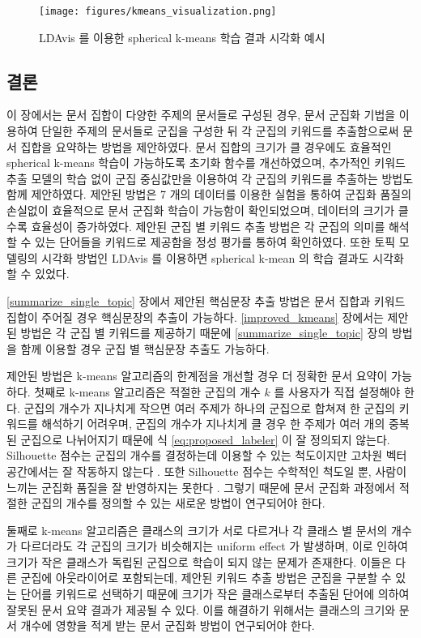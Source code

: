 \documentclass[11pt]{article}
\begin{document}
\begin{figure}[H]
\centering
\texttt{[image: figures/kmeans\_visualization.png]}
\label{fig:kmeans_ldavis}
\caption{LDAvis 를 이용한 spherical k-means 학습 결과 시각화 예시}
\end{figure}


\subsection{결론}

이 장에서는 문서 집합이 다양한 주제의 문서들로 구성된 경우, 문서 군집화 기법을 이용하여 단일한 주제의 문서들로 군집을 구성한 뒤 각 군집의 키워드를 추출함으로써 문서 집합을 요약하는 방법을 제안하였다.
문서 집합의 크기가 클 경우에도 효율적인 spherical k-means 학습이 가능하도록 초기화 함수를 개선하였으며, 추가적인 키워드 추출 모델의 학습 없이 군집 중심값만을 이용하여 각 군집의 키워드를 추출하는 방법도 함께 제안하였다.
제안된 방법은 7 개의 데이터를 이용한 실험을 통하여 군집화 품질의 손실없이 효율적으로 문서 군집화 학습이 가능함이 확인되었으며, 데이터의 크기가 클수록 효율성이 증가하였다.
제안된 군집 별 키워드 추출 방법은 각 군집의 의미를 해석할 수 있는 단어들을 키워드로 제공함을 정성 평가를 통하여 확인하였다.
또한 토픽 모델링의 시각화 방법인 LDAvis 를 이용하면 spherical k-mean 의 학습 결과도 시각화 할 수 있었다.

\ref{summarize_single_topic} 장에서 제안된 핵심문장 추출 방법은 문서 집합과 키워드 집합이 주어질 경우 핵심문장의 추출이 가능하다.
\ref{improved_kmeans} 장에서는 제안된 방법은 각 군집 별 키워드를 제공하기 때문에 \ref{summarize_single_topic} 장의 방법을 함께 이용할 경우 군집 별 핵심문장 추출도 가능하다.

제안된 방법은 k-means 알고리즘의 한계점을 개선할 경우 더 정확한 문서 요약이 가능하다.
첫째로 k-means 알고리즘은 적절한 군집의 개수 $k$ 를 사용자가 직접 설정해야 한다.
군집의 개수가 지나치게 작으면 여러 주제가 하나의 군집으로 합쳐져 한 군집의 키워드를 해석하기 어려우며, 군집의 개수가 지나치게 클 경우 한 주제가 여러 개의 중복된 군집으로 나뉘어지기 때문에 식 \ref{eq:proposed_labeler} 이 잘 정의되지 않는다.
Silhouette 점수는 군집의 개수를 결정하는데 이용할 수 있는 척도이지만 고차원 벡터 공간에서는 잘 작동하지 않는다 \citep{almeida2011there}.
또한 Silhouette 점수는 수학적인 척도일 뿐, 사람이 느끼는 군집화 품질을 잘 반영하지는 못한다 \citep{newman2010evaluating}.
그렇기 때문에 문서 군집화 과정에서 적절한 군집의 개수를 정의할 수 있는 새로운 방법이 연구되어야 한다.

둘째로 k-means 알고리즘은 클래스의 크기가 서로 다르거나 각 클래스 별 문서의 개수가 다르더라도 각 군집의 크기가 비슷해지는 uniform effect \citep{xiong2008k} 가 발생하며, 이로 인하여 크기가 작은 클래스가 독립된 군집으로 학습이 되지 않는 문제가 존재한다.
이들은 다른 군집에 아웃라이어로 포함되는데, 제안된 키워드 추출 방법은 군집을 구분할 수 있는 단어를 키워드로 선택하기 때문에 크기가 작은 클래스로부터 추출된 단어에 의하여 잘못된 문서 요약 결과가 제공될 수 있다.
이를 해결하기 위해서는 클래스의 크기와 문서 개수에 영향을 적게 받는 문서 군집화 방법이 연구되어야 한다.
\end{document}
